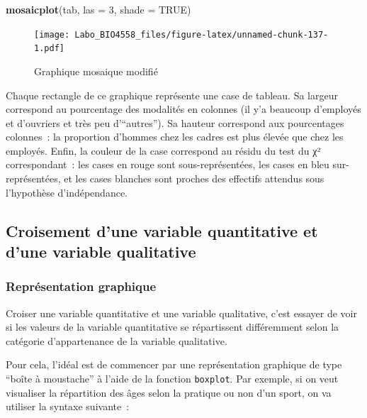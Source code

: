 \documentclass[12pt,]{book}
\newenvironment{Shaded}{\begin{snugshade}}{\end{snugshade}}
\newcommand{\DataTypeTok}[1]{\textcolor[rgb]{0.13,0.29,0.53}{#1}}
\newcommand{\DecValTok}[1]{\textcolor[rgb]{0.00,0.00,0.81}{#1}}
\newcommand{\KeywordTok}[1]{\textcolor[rgb]{0.13,0.29,0.53}{\textbf{#1}}}
\newcommand{\NormalTok}[1]{#1}
\newcommand{\OtherTok}[1]{\textcolor[rgb]{0.56,0.35,0.01}{#1}}
\begin{document}
\begin{Shaded}
\begin{Highlighting}[]
\KeywordTok{mosaicplot}\NormalTok{(tab, }\DataTypeTok{las =} \DecValTok{3}\NormalTok{, }\DataTypeTok{shade =} \OtherTok{TRUE}\NormalTok{)}
\end{Highlighting}
\end{Shaded}

\begin{figure}
\centering
\texttt{[image: Labo\_BIO4558\_files/figure-latex/unnamed-chunk-137-1.pdf]}
\caption{\label{fig:unnamed-chunk-137}Graphique mosaique modifié}
\end{figure}

Chaque rectangle de ce graphique représente une case de tableau. Sa largeur correspond au pourcentage des modalités en colonnes (il y'a beaucoup d'employés et d'ouvriers et très peu d'``autres''). Sa hauteur correspond aux pourcentages colonnes~: la proportion d'hommes chez les cadres est plus élevée que chez les employés. Enfin, la couleur de la case correspond au résidu du test du χ² correspondant~: les cases en rouge sont sous-représentées, les cases en bleu sur-représentées, et les cases blanches sont proches des effectifs attendus sous l'hypothèse d'indépendance.

\hypertarget{croisement-dune-variable-quantitative-et-dune-variable-qualitative}{%
\subsection{Croisement d'une variable quantitative et d'une variable qualitative}\label{croisement-dune-variable-quantitative-et-dune-variable-qualitative}}

\hypertarget{repruxe9sentation-graphique-2}{%
\subsubsection{Représentation graphique}\label{repruxe9sentation-graphique-2}}

Croiser une variable quantitative et une variable qualitative, c'est essayer de voir si les valeurs de la variable quantitative se répartissent différemment selon la catégorie d'appartenance de la variable qualitative.

Pour cela, l'idéal est de commencer par une représentation graphique de type ``boîte à moustache'' à l'aide de la fonction \texttt{boxplot}. Par exemple, si on veut visualiser la répartition des âges selon la pratique ou non d'un sport, on va utiliser la syntaxe suivante~:
\end{document}
